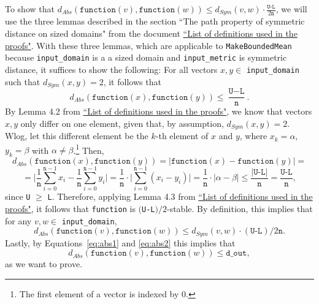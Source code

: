 \documentclass[11pt,a4paper]{article}
\theoremstyle{definition}
\newcommand{\dout}{\texttt{d\_out}}
\newcommand{\function}{\texttt{function}}
\newcommand{\silvia}[1]{{ {\color{blue}{(silvia)~#1}}}}
\begin{document}
To show that $d_{Abs}(\function(v), \function(w)) \leq d_{Sym}(v, w) \cdot \frac{\texttt{U-L}}{2\texttt{n}}$, we will use the three lemmas described in the section ``The path property of symmetric distance on sized domains" from the document \href{https://www.overleaf.com/project/60d214e390b337703d200982}{``List of definitions used in the proofs"}. With these three lemmas, which are applicable to \texttt{MakeBoundedMean} because \texttt{input\_domain} is a a sized domain and \texttt{input\_metric} is symmetric distance, it suffices to show the following: For all vectors $x, y \in$ \texttt{input\_domain} such that $d_{Sym}(x, y) = 2$, it follows that 
\[
d_{Abs}(\texttt{function}(x), \texttt{function}(y)) \leq \dfrac{\texttt{U} - \texttt{L}}{\texttt{n}}.
\]
By Lemma 4.2 from \href{https://www.overleaf.com/project/60d214e390b337703d200982}{``List of definitions used in the proofs"}, we know that vectors $x, y$ only differ on one element, given that, by assumption, $d_{Sym}(x, y) = 2$. Wlog, let this different element be the $k$-th element of $x$ and $y$, where $x_k = \alpha$, $y_k = \beta$ with $\alpha \neq \beta$.\footnote{The first element of a vector is indexed by 0.} Then,
\[
    d_{Abs}(\texttt{function}(x), \texttt{function}(y)) = |\texttt{function}(x) - \texttt{function}(y)| = 
\]
\[
    = \Big|\dfrac{1}{\texttt{n}}\sum_{i=0}^{\texttt{n}-1}x_i - \dfrac{1}{\texttt{n}}\sum_{i=0}^{\texttt{n}-1}y_i\Big| = \dfrac{1}{\texttt{n}} \cdot \Big| \sum_{i=0}^{\texttt{n}-1} (x_i - y_i) \Big| = \dfrac{1}{\texttt{n}}\cdot|\alpha - \beta| \leq \dfrac{|\texttt{U-L}|}{\texttt{n}} = \dfrac{\texttt{U-L}}{\texttt{n}},
\]
since \texttt{U} $\geq$ \texttt{L}. Therefore, applying Lemma 4.3 from \href{https://www.overleaf.com/project/60d214e390b337703d200982}{``List of definitions used in the proofs"}, it follows that \texttt{function} is $($\texttt{U-L}$)/2$-stable. By definition, this implies that for any $v, w \in$ \texttt{input\_domain},
\[
    d_{Abs}(\texttt{function}(v), \texttt{function}(w)) \leq d_{Sym}(v, w) \cdot (\texttt{U-L})/2\texttt{n}.
\]
Lastly, by Equations~\ref{eq:abs1} and \ref{eq:abs2} this implies that
\[
    d_{Abs}(\function(v), \function(w)) \leq \dout,
\]
as we want to prove.

\silvia{Flag: this will be updated to the more general notion of path property (through shortest path metric on a graph), but this matches the current version of the proofs document.}

\silvia{Flag: need to account for rounding errors in the stability relation given the non-closure of float addition, as discussed on the week of August 2nd. We are figuring this out.}
\end{document}
